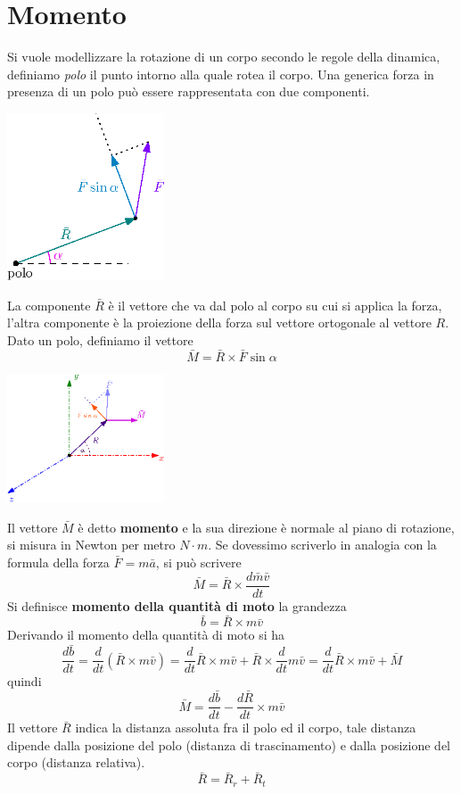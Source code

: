 \documentclass[10pt, letterpaper]{report}
\begin{document}
\flowerLine 
\section{Momento}
Si vuole modellizzare la rotazione di un corpo secondo le 
regole della dinamica, definiamo \textit{polo} il punto 
intorno alla quale rotea il corpo. Una generica forza in presenza di un 
polo può essere rappresentata con due componenti.\begin{center}
    \includegraphics[width=0.35\textwidth]{images/momento1.eps}
\end{center}
La componente $\bar R$ è il vettore che va dal polo al corpo su cui 
si applica la forza, l'altra componente è la proiezione 
della forza sul vettore ortogonale al vettore $R$.
Dato un polo, definiamo il vettore 
$$ \bar M = \bar R \times \bar F\sin\alpha$$
\begin{center}
    \includegraphics[width=0.35\textwidth]{images/momentoAngolare.eps}
\end{center}
Il vettore $\bar M$ è detto \textbf{momento} e la sua direzione è 
normale al piano di rotazione, si misura in Newton per metro $N\cdot m$.
Se dovessimo scriverlo in analogia con la formula della forza $\bar F = m\bar a$, si 
può scrivere 
$$ \bar M = \bar R \times \frac{d\bar m\bar v}{dt}$$
Si definisce \textbf{momento della quantità di moto } la grandezza 
$$ \bar b = \bar R\times m\bar v$$
Derivando il momento della quantità di moto si ha 
$$\frac{d\bar b}{dt}=\frac{d}{dt}(\bar R \times m\bar v)=
\frac{d}{dt}\bar R \times m\bar v + \bar R \times \frac{d}{dt}m\bar v = 
\frac{d}{dt}\bar R \times m\bar v + \bar M $$
quindi 
$$\bar M=\frac{d\bar b}{dt}-\frac{d\bar R}{dt}\times m \bar v$$ 
Il vettore $\bar R$ indica la distanza assoluta fra il polo ed il corpo, tale distanza dipende 
dalla posizione del polo (distanza di trascinamento) e dalla posizione del corpo (distanza relativa).
$$ \bar R = \bar R_r + \bar R_t$$
\end{document}
